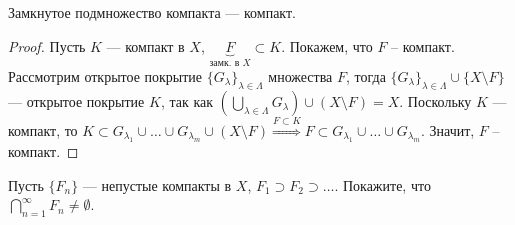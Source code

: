 \begin{lemma}
    \label{lem_comp_subset}
    Замкнутое подмножество компакта --- компакт.

    \begin{proof}
        Пусть $K$ --- компакт в $X$, $\underbrace{F}_{\text{замк. в $X$}} \subset K$. Покажем, что $F$ -- компакт. Рассмотрим открытое покрытие $\{G_\lambda\}_{\lambda \in \Lambda}$ множества $F$, тогда $\{G_{\lambda}\}_{\lambda \in \Lambda} \cup \{X \setminus F\}$ --- открытое покрытие $K$, так как $\left(\bigcup_{\lambda \in \Lambda} G_\lambda\right) \cup (X \setminus F) = X$. Поскольку $K$ --- компакт, то $K \subset G_{\lambda_1} \cup \ldots \cup G_{\lambda_m} \cup (X \setminus F) \overset{F \subset K}{\Rightarrow} F \subset G_{\lambda_1} \cup \ldots \cup G_{\lambda_m}$. Значит, $F$ -- компакт.
    \end{proof}
\end{lemma}

\begin{problem}
    Пусть $\{F_n\}$ --- непустые компакты в $X$, $F_1 \supset F_2 \supset \ldots$. Покажите, что $\bigcap_{n = 1}^\infty F_n \neq \emptyset$.
\end{problem}

